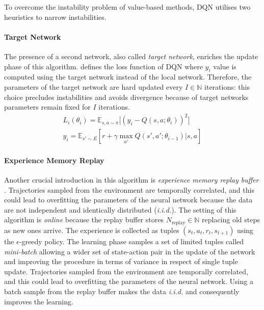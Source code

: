 To overcome the instability problem of value-based methods, DQN utilises two heuristics to narrow instabilities.

\paragraph{Target Network}
The presence of a second network, also called  \textit{target network}, enriches the update phase of this algorithm.
defines the loss function of DQN where $y_i$ value is computed using the target network instead of the local network.
Therefore, the parameters of the target network are hard updated every $I \in \mathbb{N}$ iterations: this choice precludes instabilities and avoids divergence because of target networks parameters remain fixed for $I$ iterations.
\begin{equation} \label{eq:lossdqn}
	\begin{gathered}
		L_i(\theta_i) = \mathbb{E}_{s, a \sim \pi}\big[(y_i - Q(s, a; \theta_i))^2\big]\\
		y_i = \mathbb{E}_{s' \sim E}[r + \gamma \max_{a'}Q(s',a'; \theta_{i-1})|s,a]
	\end{gathered}
\end{equation}

\paragraph{Experience Memory Replay} \label{experience}

Another crucial introduction in this algorithm is \textit{experience memory replay buffer} \cite{lin1992self}.
Trajectories sampled from the environment are temporally correlated, and this could lead to overfitting the parameters of the neural network because the data are not independent and identically distributed (\textit{i.i.d.}).
The setting of this algorithm is \textit{online} because the replay buffer stores $N_{\text{replay}} \in \mathbb{N}$ replacing old steps as new ones arrive.
The experience is collected as tuples $(s_t,a_t,r_t,s_{t+1})$ using the $\epsilon$-greedy policy.
The learning phase samples a set of limited tuples called \textit{mini-batch} allowing a wider set of state-action pair in the update of the network and improving the procedure in terms of variance in respect of single tuple update.
Trajectories sampled from the environment are temporally correlated, and this could lead to overfitting the parameters of the neural network.
Using a batch sample from the replay buffer makes the data \textit{i.i.d.} and consequently improves the learning.

